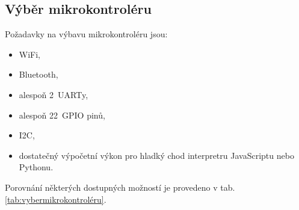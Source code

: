 \subsection{Výběr mikrokontroléru \label{subs:vybermikrokontroléru}}
Požadavky na výbavu mikrokontroléru jsou:
\begin{itemize}
    \item WiFi,
    \item Bluetooth,
    \item alespoň 2~UARTy,
    \item alespoň 22~GPIO pinů,
    \item I2C,
    \item dostatečný výpočetní výkon pro hladký chod interpretru JavaScriptu nebo Pythonu.
\end{itemize}

Porovnání některých dostupných možností je provedeno v tab. \ref{tab:vybermikrokontroléru}.
